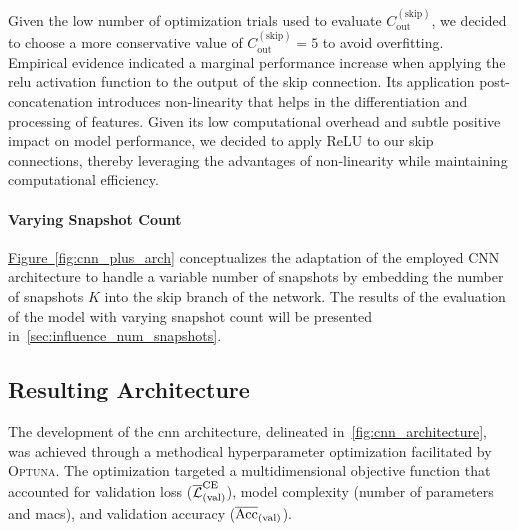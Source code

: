 Given the low number of optimization trials used to evaluate  \( C_{\text{out}}^{(\text{skip})} \), we decided to choose
a more conservative value of \( C_{\text{out}}^{(\text{skip})} = 5 \) to avoid overfitting. \\
Empirical evidence indicated a marginal performance increase when applying the \gls{relu} activation function to the
output of the skip connection. Its application post-concatenation introduces non-linearity that helps in the differentiation
and processing of features. Given its low
computational overhead and subtle positive impact on model performance, we decided to apply ReLU to our skip connections, thereby
leveraging the advantages of non-linearity while maintaining computational efficiency.

\paragraph{Varying Snapshot Count}
\hyperref[fig:cnn_plus_arch]{Figure~\ref*{fig:cnn_plus_arch}} conceptualizes the adaptation of the employed CNN architecture to handle a variable number
of snapshots by embedding the number of snapshots \( K \) into the skip branch of the network.
The results of the evaluation of the model with varying snapshot count will be presented in~\autoref{sec:influence_num_snapshots}.

\subsection{Resulting Architecture}
\label{subsubsec:resulting_architecture}

The development of the \gls{cnn} architecture, delineated in~\autoref{fig:cnn_architecture}, was achieved through a
methodical hyperparameter optimization facilitated by \textsc{Optuna}.
The optimization targeted a multidimensional objective function that accounted for validation loss (\( \overline{\mathcal{L}}_{(\text{val})}^{\text{CE}} \)),
model complexity (number of parameters and \glspl{mac}), and validation accuracy (\( \overline{\text{Acc}}_{(\text{val})} \)).

